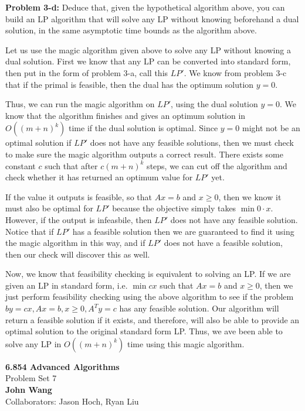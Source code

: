 \documentclass[psamsfonts]{amsart}
\newenvironment{sol}{\vspace{0.25cm}{\large \bfseries Solution:}}{\qedsymbol}
\newenvironment{prob}[1]{\begin{framed}{\large \bfseries Problem #1:}}{\end{framed}}
\newcommand{\makenewtitle}{
    \begin{center}
    {\huge \bfseries 6.854 Advanced Algorithms} \\
    Problem Set 7\\
    \vspace{0.25cm}
    {\bfseries John Wang} \\
    Collaborators: Jason Hoch, Ryan Liu 
    \end{center}
    \vspace{0.5cm}
}
\begin{document}
\begin{prob}{3-d}
Deduce that, given the hypothetical algorithm above, you can build an LP algorithm that will solve any LP without knowing beforehand a dual solution, in the same asymptotic time bounds as the algorithm above.
\end{prob}
\begin{sol}
Let us use the magic algorithm given above to solve any LP without knowing a dual solution. First we know that any LP can be converted into standard form, then put in the form of problem 3-a, call this $LP'$. We know from problem 3-c that if the primal is feasible, then the dual has the optimum solution $y=0$. 

Thus, we can run the magic algorithm on $LP'$, using the dual solution $y=0$. We know that the algorithm finishes and gives an optimum solution in $O((m+n)^k)$ time if the dual solution is optimal. Since $y=0$ might not be an optimal solution if $LP'$ does not have any feasible solutions, then we must check to make sure the magic algorithm outputs a correct result. There exists some constant $c$ such that after $c(m+n)^k$ steps, we can cut off the algorithm and check whether it has returned an optimum value for $LP'$ yet.

If the value it outputs is feasible, so that $Ax = b$ and $x \geq 0$, then we know it must also be optimal for $LP'$ because the objective simply takes $\min 0 \cdot x$. However, if the output is infeasbile, then $LP'$ does not have any feasible solution. Notice that if $LP'$ has a feasible solution then we are guaranteed to find it using the magic algorithm in this way, and if $LP'$ does not have a feasible solution, then our check will discover this as well.

Now, we know that feasibility checking is equivalent to solving an LP. If we are given an LP in standard form, i.e. $\min cx$ such that $Ax = b$ and $x \geq 0$, then we just perform feasibility checking using the above algorithm to see if the problem $by = cx, Ax = b, x \geq 0, A^T y = c$ has any feasible solution. Our algorithm will return a feasible solution if it exists, and therefore, will also be able to provide an optimal solution to the original standard form LP. Thus, we ave been able to solve any LP in $O((m+n)^k)$ time using this magic algorithm.
\end{sol}

\newpage
\makenewtitle
\end{document}
